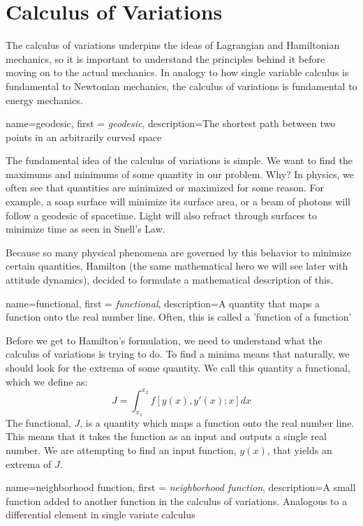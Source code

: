 \documentclass[12pt]{report}
\begin{document}
\section{Calculus of Variations}

The calculus of variations underpins the ideas of Lagrangian and Hamiltonian mechanics, so it is important to understand the principles behind it before moving on to the actual mechanics. In analogy to how single variable calculus is fundamental to Newtonian mechanics, the calculus of variations is fundamental to energy mechanics.

{
    name=geodesic,
    first = {\textit{geodesic}},
    description={The shortest path between two points in an arbitrarily curved space}
}

The fundamental idea of the calculus of variations is simple. We want to find the maximums and minimums of some quantity in our problem. Why? In physics, we often see that quantities are minimized or maximized for some reason. For example, a soap surface will minimize its surface area, or a beam of photons will follow a \gls{geodesic} of spacetime. Light will also refract through surfaces to minimize time as seen in Snell's Law. 

Because so many physical phenomena are governed by this behavior to minimize certain quantities, Hamilton (the same mathematical hero we will see later with attitude dynamics), decided to formulate a mathematical description of this.

{
    name=functional,
    first = {\textit{functional}},
    description={A quantity that maps a function onto the real number line. Often,  this is called a 'function of a function'}
}

Before we get to Hamilton's formulation, we need to understand what the calculus of variations is trying to do. To find a minima means that naturally, we should look for the extrema of some quantity. We call this quantity a \gls{functional}, which we define as:
\begin{equation}\label{eq:functional}
    J=\int_{x_1}^{x_2}f\left[y(x),y'(x);x\right]{dx}
\end{equation}
The \gls{functional}, $J$, is a quantity which maps a function onto the real number line. This means that it takes the function as an input and outputs a single real number. We are attempting to find an input function, $y(x)$, that yields an extrema of $J$. 

{
    name=neighborhood function,
    first = {\textit{neighborhood function}},
    description={A small function added to another function in the calculus of variations. Analogous to a differential element in single variate calculus}
}
\end{document}
